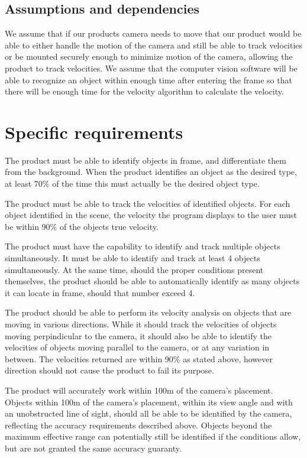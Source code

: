 \documentclass[letterpaper,10pt,onecolumn,draftclsnofoot]{IEEEtran}
\begin{document}
\subsection{Assumptions and dependencies}
We assume that if our products camera needs to move that our product would be able to either handle the motion of the camera and still be able to track velocities or be mounted securely enough to minimize motion of the camera, allowing the product to track velocities.
We assume that the computer vision software will be able to recognize an object within enough time after entering the frame so that there will be enough time for the velocity algorithm to calculate the velocity.

\section{Specific requirements}
The product must be able to identify objects in frame, and differentiate them from the background.
When the product identifies an object as the desired type, at least 70\% of the time this must actually be the desired object type.

The product must be able to track the velocities of identified objects.
For each object identified in the scene, the velocity the program displays to the user must be within 90\% of the objects true velocity.

The product must have the capability to identify and track multiple objects simultaneously.
It must be able to identify and track at least 4 objects simultaneously.
At the same time, should the proper conditions present themselves, the product should be able to automatically identify as many objects it can locate in frame, should that number exceed 4.

The product should be able to perform its velocity analysis on objects that are moving in various directions.
While it should track the velocities of objects moving perpindicular to the camera, it should also be able to identify the velocities of objects moving parallel to the camera, or at any variation in between.
The velocities returned are within 90\% as stated above, however direction should not cause the product to fail its purpose.

The product will accurately work within 100m of the camera's placement.
Objects within 100m of the camera's placement, within its view angle and with an unobstructed line of sight, should all be able to be identified by the camera, reflecting the accuracy requirements described above.
Objects beyond the maximum effective range can potentially still be identified if the conditions allow, but are not granted the same accuracy guaranty.
\end{document}
